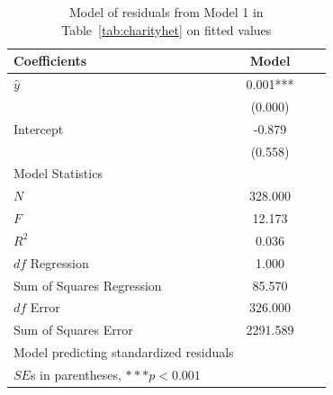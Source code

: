 \begin{table}[htbp]\centering
\caption{Model of residuals from Model 1 in Table~\ref{tab:charityhet} on fitted values
\label{tab:charityresid}}
\begin{tabular}{lccc}
\hline
Coefficients&Model \\
\hline
$\hat{y}$   &    0.001***\\
      &   (0.000)  \\
Intercept    &   -0.879  \\
      &   (0.558)  \\
\hline
\multicolumn{1}{l}{Model Statistics} \\
\hline
$N$ 				 &   328.000  \\
$F$ 				 &   12.173  \\
$R^2$ 			  &    0.036  \\
$df$ Regression 	 &    1.000  \\
Sum of Squares Regression 	 &   85.570  \\
$df$ Error 			 &   326.000  \\
Sum of Squares Error 	 &  2291.589  \\
\hline
\multicolumn{1}{l}{Model predicting standardized residuals} \\
\multicolumn{1}{l}{$SE$s in parentheses, $***p<0.001$} \\
\hline
\end{tabular}
\end{table}